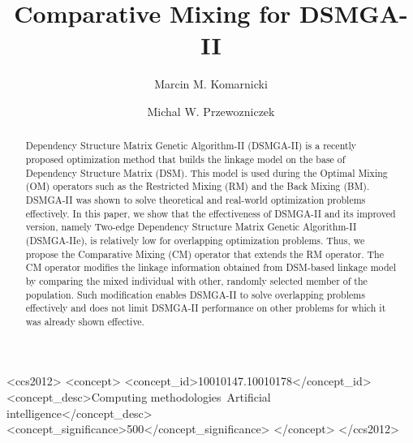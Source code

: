 \documentclass[sigconf]{acmart}
\begin{document}
\title{Comparative Mixing for DSMGA-II}

\author{Marcin M. Komarnicki}

\author{Michal W. Przewozniczek}


\begin{abstract}
	
Dependency Structure Matrix Genetic Algorithm-II (DSMGA-II) is a recently proposed optimization method that builds the linkage model on the base of Dependency Structure Matrix (DSM). This model is used during the Optimal Mixing (OM) operators such as the Restricted Mixing (RM) and the Back Mixing (BM). DSMGA-II was shown to solve theoretical and real-world optimization problems effectively. In this paper, we show that the effectiveness of DSMGA-II and its improved version, namely Two-edge Dependency Structure Matrix Genetic Algorithm-II (DSMGA-IIe), is relatively low for overlapping optimization problems. Thus, we propose the Comparative Mixing (CM) operator that extends the RM operator. The CM operator modifies the linkage information obtained from DSM-based linkage model by comparing the mixed individual with other, randomly selected member of the population. Such modification enables DSMGA-II to solve overlapping problems effectively and does not limit DSMGA-II performance on other problems for which it was already shown effective.

\end{abstract}

%
%
 \begin{CCSXML}
	<ccs2012>
		<concept>
			<concept_id>10010147.10010178</concept_id>
			<concept_desc>Computing methodologies~Artificial intelligence</concept_desc>
			<concept_significance>500</concept_significance>
		</concept>
	</ccs2012>
\end{CCSXML}



\keywords{\textcolor{red}{Linkage Learning, Genetic Algorithms}}


\maketitle




 
\end{document}
